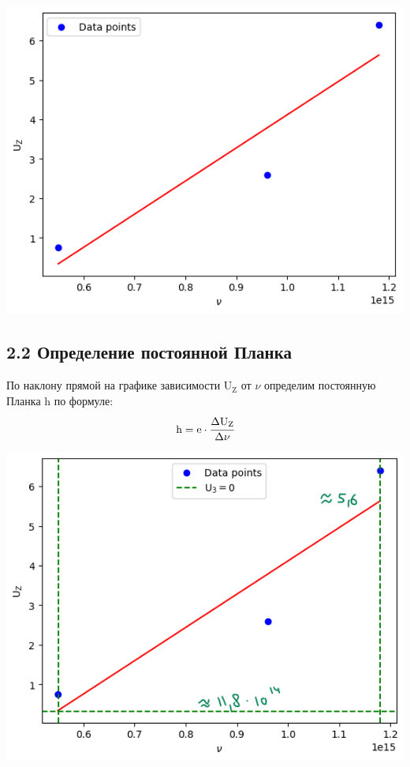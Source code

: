 \documentclass[12pt,openany]{book}
\begin{document}
\begin{center}
    \includegraphics[scale=0.59]{11.1} \\
\end{center}

\subsection*{2.2  Определение постоянной Планка}

\vspace{10pt}

\noindent По наклону прямой на графике зависимости $\text{U}_\text{Z}$ 
от $\nu$ определим постоянную Планка h по формуле:\\

\begin{equation*}
    \text{h} = \text{e} \cdot \cfrac{\Delta \text{U}_\text{Z}}{\Delta \nu}
\end{equation*}

\begin{center}
    \includegraphics[scale=0.59]{11.2} \\
\end{center}
\end{document}
